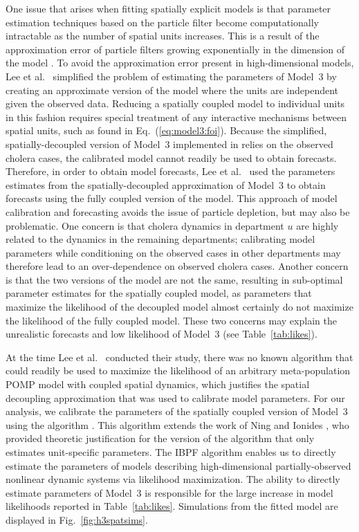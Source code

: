 \documentclass[10pt,letterpaper]{article}\usepackage[]{graphicx}\usepackage[table]{xcolor}
\newcommand\myeqref[1]{(\ref{#1})}
\begin{document}
One issue that arises when fitting spatially explicit models is that parameter estimation techniques based on the particle filter become computationally intractable as the number of spatial units increases.
This is a result of the approximation error of particle filters growing exponentially in the dimension of the model \cite{rebeschini15,park20}.
To avoid the approximation error present in high-dimensional models, Lee et al.~\cite{lee20} simplified the problem of estimating the parameters of Model~3 by creating an approximate version of the model where the units are independent given the observed data.
Reducing a spatially coupled model to individual units in this fashion requires special treatment of any interactive mechanisms between spatial units, such as found in Eq.~\myeqref{eq:model3:foi}.
Because the simplified, spatially-decoupled version of Model~3 implemented in \cite{lee20} relies on the observed cholera cases, the calibrated model cannot readily be used to obtain forecasts.
Therefore, in order to obtain model forecasts, Lee et al.~\cite{lee20} used the parameters estimates from the spatially-decoupled approximation of Model~3 to obtain forecasts using the fully coupled version of the model.
This approach of model calibration and forecasting avoids the issue of particle depletion, but may also be problematic.
One concern is that cholera dynamics in department $u$ are highly related to the dynamics in the remaining departments;
calibrating model parameters while conditioning on the observed cases in other departments may therefore lead to an over-dependence on observed cholera cases.
Another concern is that the two versions of the model are not the same, resulting in sub-optimal parameter estimates for the spatially coupled model,
as parameters that maximize the likelihood of the decoupled model almost certainly do not maximize the likelihood of the fully coupled model.
These two concerns may explain the unrealistic forecasts and low likelihood of Model~3   (see Table~\ref{tab:likes}).

At the time Lee et al.~\cite{lee20} conducted their study, there was no known algorithm that could readily be used to maximize the likelihood of an arbitrary meta-population POMP model with coupled spatial dynamics, which justifies the spatial decoupling approximation that was used to calibrate model parameters.
For our analysis, we calibrate the parameters of the spatially coupled version of Model~3 using the   algorithm \cite{ionides22}.
This algorithm extends the work of Ning and Ionides \cite{ning23}, who provided theoretic justification for the version of the algorithm that only estimates unit-specific parameters.
The IBPF algorithm enables us to directly estimate the parameters of models describing high-dimensional partially-observed nonlinear dynamic systems via likelihood maximization.
The ability to directly estimate parameters of Model~3 is responsible for the large increase in model likelihoods reported in Table~\ref{tab:likes}.
Simulations from the fitted model are displayed in Fig.~\ref{fig:h3spatsims}.
\end{document}
